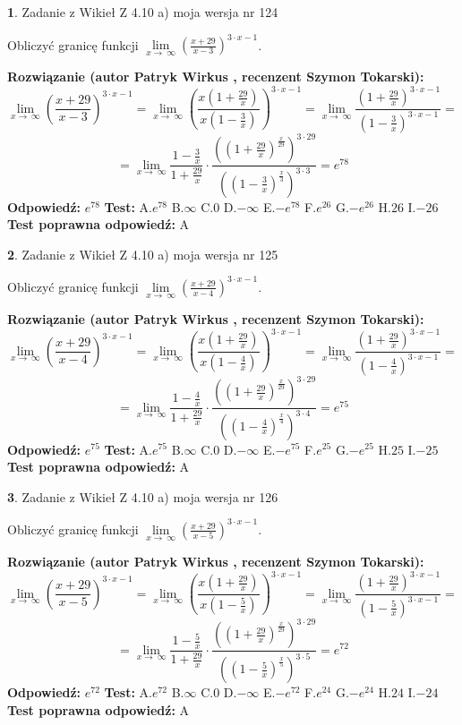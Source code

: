 \documentclass[12pt, a4paper]{article}
\theoremstyle{definition} %
\newtheorem{zad}{}
\newcommand{\zadStart}[1]{\begin{zad}#1\newline}
\newcommand{\zadStop}{\end{zad}}
\newcommand{\rozwStart}[2]{\noindent \textbf{Rozwiązanie (autor #1 , recenzent #2): }\newline}
\newcommand{\rozwStop}{\newline}
\newcommand{\odpStart}{\noindent \textbf{Odpowiedź:}\newline}
\newcommand{\odpStop}{\newline}
\newcommand{\testStart}{\noindent \textbf{Test:}\newline}
\newcommand{\testStop}{\newline}
\newcommand{\kluczStart}{\noindent \textbf{Test poprawna odpowiedź:}\newline}
\newcommand{\kluczStop}{\newline}
\begin{document}
\zadStart{Zadanie z Wikieł Z 4.10 a) moja wersja nr 124}

Obliczyć granicę funkcji  $\lim\limits_{x\to\ \infty}(\frac{x+29}{x-3})^{3\cdot x-1}$.
\zadStop
\rozwStart{Patryk Wirkus}{Szymon Tokarski}
$$\lim\limits_{x\to\ \infty}(\frac{x+29}{x-3})^{3\cdot x-1} = \lim\limits_{x\to\ \infty}(\frac{x(1+\frac{29}{x})}{x(1-\frac{3}{x})})^{3\cdot x-1}=\lim\limits_{x\to\ \infty}\frac{(1+\frac{29}{x})^{3\cdot x-1}}{(1-\frac{3}{x})^{3\cdot x-1}}=$$
$$=\lim\limits_{x\to\ \infty}\frac{1-\frac{3}{x}}{1+\frac{29}{x}}\cdot\frac{((1+\frac{29}{x})^{\frac{x}{29}})^{3\cdot29}}{((1-\frac{3}{x})^{\frac{x}{3}})^{3\cdot3}}=e^{78}$$
\rozwStop
\odpStart
$e^{78}$
\odpStop
\testStart
A.$e^{78}$ B.$\infty$ C.$0$ D.$-\infty$ E.$-e^{78}$
F.$e^{26}$ G.$-e^{26}$
H.$26$
I.$-26$
\testStop
\kluczStart
A
\kluczStop



\zadStart{Zadanie z Wikieł Z 4.10 a) moja wersja nr 125}

Obliczyć granicę funkcji  $\lim\limits_{x\to\ \infty}(\frac{x+29}{x-4})^{3\cdot x-1}$.
\zadStop
\rozwStart{Patryk Wirkus}{Szymon Tokarski}
$$\lim\limits_{x\to\ \infty}(\frac{x+29}{x-4})^{3\cdot x-1} = \lim\limits_{x\to\ \infty}(\frac{x(1+\frac{29}{x})}{x(1-\frac{4}{x})})^{3\cdot x-1}=\lim\limits_{x\to\ \infty}\frac{(1+\frac{29}{x})^{3\cdot x-1}}{(1-\frac{4}{x})^{3\cdot x-1}}=$$
$$=\lim\limits_{x\to\ \infty}\frac{1-\frac{4}{x}}{1+\frac{29}{x}}\cdot\frac{((1+\frac{29}{x})^{\frac{x}{29}})^{3\cdot29}}{((1-\frac{4}{x})^{\frac{x}{4}})^{3\cdot4}}=e^{75}$$
\rozwStop
\odpStart
$e^{75}$
\odpStop
\testStart
A.$e^{75}$ B.$\infty$ C.$0$ D.$-\infty$ E.$-e^{75}$
F.$e^{25}$ G.$-e^{25}$
H.$25$
I.$-25$
\testStop
\kluczStart
A
\kluczStop



\zadStart{Zadanie z Wikieł Z 4.10 a) moja wersja nr 126}

Obliczyć granicę funkcji  $\lim\limits_{x\to\ \infty}(\frac{x+29}{x-5})^{3\cdot x-1}$.
\zadStop
\rozwStart{Patryk Wirkus}{Szymon Tokarski}
$$\lim\limits_{x\to\ \infty}(\frac{x+29}{x-5})^{3\cdot x-1} = \lim\limits_{x\to\ \infty}(\frac{x(1+\frac{29}{x})}{x(1-\frac{5}{x})})^{3\cdot x-1}=\lim\limits_{x\to\ \infty}\frac{(1+\frac{29}{x})^{3\cdot x-1}}{(1-\frac{5}{x})^{3\cdot x-1}}=$$
$$=\lim\limits_{x\to\ \infty}\frac{1-\frac{5}{x}}{1+\frac{29}{x}}\cdot\frac{((1+\frac{29}{x})^{\frac{x}{29}})^{3\cdot29}}{((1-\frac{5}{x})^{\frac{x}{5}})^{3\cdot5}}=e^{72}$$
\rozwStop
\odpStart
$e^{72}$
\odpStop
\testStart
A.$e^{72}$ B.$\infty$ C.$0$ D.$-\infty$ E.$-e^{72}$
F.$e^{24}$ G.$-e^{24}$
H.$24$
I.$-24$
\testStop
\kluczStart
A
\kluczStop
\end{document}
